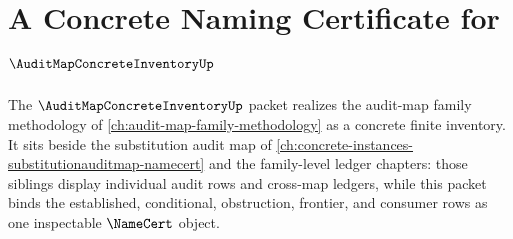 \chapter{A Concrete Naming Certificate for $\AuditMapConcreteInventoryUp$}
\label{ch:concrete-instances-audit-map-concrete-inventory-namecert}

The $\AuditMapConcreteInventoryUp$ packet realizes the audit-map family methodology of \autoref{ch:audit-map-family-methodology} as a concrete finite inventory. It sits beside the substitution audit map of \autoref{ch:concrete-instances-substitutionauditmap-namecert} and the family-level ledger chapters: those siblings display individual audit rows and cross-map ledgers, while this packet binds the established, conditional, obstruction, frontier, and consumer rows as one inspectable $\NameCert$ object.

